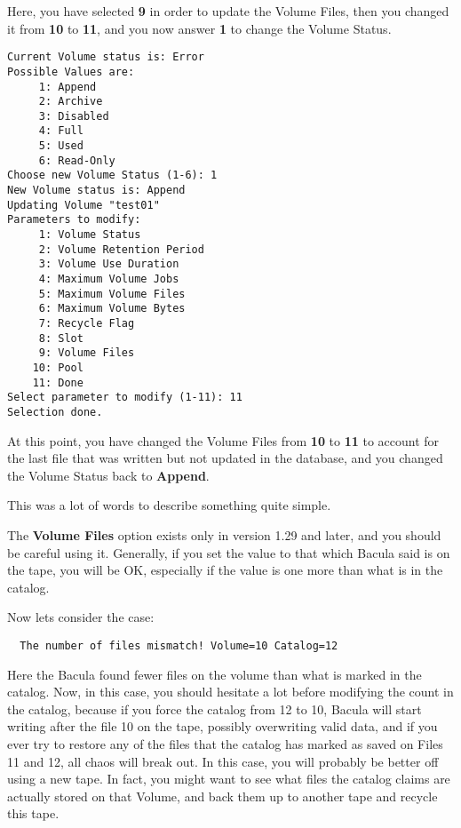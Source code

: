 Here, you have selected {\bf 9} in order to update the Volume Files, then you
changed it from {\bf 10} to {\bf 11}, and you now answer {\bf 1} to change the
Volume Status. 

\footnotesize
\begin{verbatim}
Current Volume status is: Error
Possible Values are:
     1: Append
     2: Archive
     3: Disabled
     4: Full
     5: Used
     6: Read-Only
Choose new Volume Status (1-6): 1
New Volume status is: Append
Updating Volume "test01"
Parameters to modify:
     1: Volume Status
     2: Volume Retention Period
     3: Volume Use Duration
     4: Maximum Volume Jobs
     5: Maximum Volume Files
     6: Maximum Volume Bytes
     7: Recycle Flag
     8: Slot
     9: Volume Files
    10: Pool
    11: Done
Select parameter to modify (1-11): 11
Selection done.
\end{verbatim}
\normalsize

At this point, you have changed the Volume Files from {\bf 10} to {\bf 11} to
account for the last file that was written but not updated in the database,
and you changed the Volume Status back to {\bf Append}. 

This was a lot of words to describe something quite simple. 

The {\bf Volume Files} option exists only in version 1.29 and later, and you
should be careful using it. Generally, if you set the value to that which
Bacula said is on the tape, you will be OK, especially if the value is one
more than what is in the catalog. 

Now lets consider the case: 

\footnotesize
\begin{verbatim}
  The number of files mismatch! Volume=10 Catalog=12
\end{verbatim}
\normalsize

Here the Bacula found fewer files on the volume than what is marked in the
catalog. Now, in this case, you should hesitate a lot before modifying the count
in the catalog, because if you force the catalog from 12 to 10, Bacula will
start writing after the file 10 on the tape, possibly overwriting valid data,
and if you ever try to restore any of the files that the catalog has marked as
saved on Files 11 and 12, all chaos will break out. In this case, you will
probably be better off using a new tape. In fact, you might want to see what
files the catalog claims are actually stored on that Volume, and back them up
to another tape and recycle this tape. 

